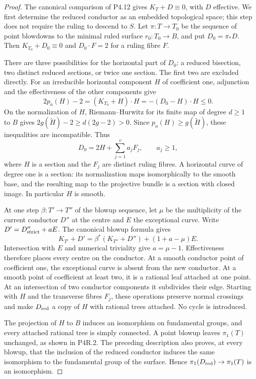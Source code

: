 \begin{proof}
The canonical comparison of P4.12 gives
$K_T+D\equiv0$, with $D$ effective. We first determine the
reduced conductor as an embedded topological space; this
step does not require the ruling to descend to $S$.
Let $\pi:T\to T_0$ be the sequence of point blowdowns to
the minimal ruled surface $r_0:T_0\to B$, and put
$D_0=\pi_*D$. Then $K_{T_0}+D_0\equiv0$ and
$D_0\cdot F=2$ for a ruling fibre $F$.

There are three possibilities for the horizontal part of
$D_0$: a reduced bisection, two distinct reduced sections,
or twice one section. The first two are excluded directly.
For an irreducible horizontal component $H$ of coefficient
one, adjunction and the effectiveness of the other
components give
\[
 2p_a(H)-2=(K_{T_0}+H)\cdot H
       =-(D_0-H)\cdot H\le0.
\]
On the normalization of $H$, Riemann--Hurwitz for its
finite map of degree $d\ge1$ to $B$ gives
$2g(\widetilde H)-2\ge d(2g-2)>0$.
Since $p_a(H)\ge g(\widetilde H)$, these inequalities
are incompatible. Thus
\[
 D_0=2H+\sum_{j=1}^{v}a_jF_j,\qquad a_j\ge1,
\]
where $H$ is a section and the $F_j$ are distinct ruling
fibres. A horizontal curve of degree one is a section:
its normalization maps isomorphically to the smooth base,
and the resulting map to the projective bundle is a
section with closed image. In particular $H$ is smooth.

At one step $\beta:T'\to T''$ of the blowup sequence,
let $\mu$ be the multiplicity of the current conductor
$D''$ at the centre and $E$ the exceptional curve.
Write $D'=D''_{\rm strict}+aE$. The canonical blowup
formula gives
\[
 K_{T'}+D'
   =\beta^*(K_{T''}+D'')+(1+a-\mu)E.
\]
Intersection with $E$ and numerical triviality give
$a=\mu-1$. Effectiveness therefore places every centre
on the conductor. At a smooth conductor point of
coefficient one, the exceptional curve is absent from
the new conductor. At a smooth point of coefficient at
least two, it is a rational leaf attached at one point.
At an intersection of two conductor components it
subdivides their edge. Starting with $H$ and the
transverse fibres $F_j$, these operations preserve
normal crossings and make $D_{\rm red}$ a copy of $H$
with rational trees attached. No cycle is introduced.

The projection of $H$ to $B$ induces an isomorphism on
fundamental groups, and every attached rational tree
is simply connected. A point blowup leaves
$\pi_1(T)$ unchanged, as shown in P4R.2. The preceding
description also proves, at every blowup, that the
inclusion of the reduced conductor induces the same
isomorphism to the fundamental group of the surface.
Hence $\pi_1(D_{\rm red})\to\pi_1(T)$ is an
isomorphism.


\end{proof}
